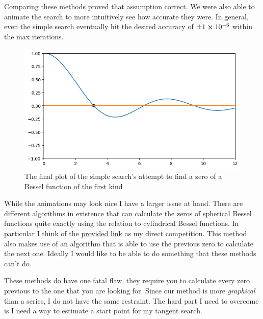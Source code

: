 Comparing these methods proved that assumption correct. We were also able to animate the search to more intuitively see how accurate they were. In general, even the simple search eventually hit the desired accuracy of $\pm 1\cross 10^{-6}$ within the max iterations.
\begin{figure}
    \centering
    \includegraphics[width=.7\linewidth]{simple.png}
    \caption{The final plot of the simple search's attempt to find a zero of a Bessel function of the first kind}
    \label{fig:simple}
\end{figure}

While the animations may look nice I have a larger issue at hand. There are different algorithms in existence that can calculate the zeros of spherical Bessel functions quite exactly using the relation to cylindrical Bessel functions. In particular I think of the \href{https://scipy-cookbook.readthedocs.io/items/SphericalBesselZeros.html}{provided link} as my direct competition. This method also makes use of an algorithm that is able to use the previous zero to calculate the next one. Ideally I would like to be able to do something that these methods can't do.

These methods do have one fatal flaw, they require you to calculate every zero previous to the one that you are looking for. Since our method is more \emph{graphical} than a series, I do not have the same restraint. The hard part I need to overcome is I need a way to estimate a start point for my tangent search. 

